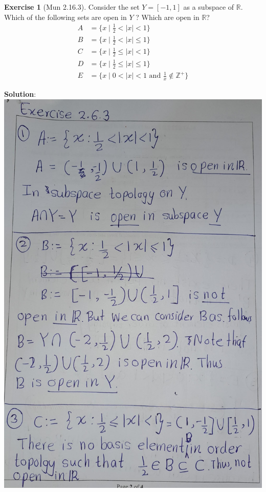 \documentclass[
]{book}
\theoremstyle{definition}
\theoremstyle{definition}
\theoremstyle{definition}
\newtheorem{exercise}{Exercise}[chapter]
\theoremstyle{definition}
\theoremstyle{remark}
\begin{document}
\begin{exercise}[Mun 2.16.3]
\protect\hypertarget{exr:unnamed-chunk-94}{}\label{exr:unnamed-chunk-94}Consider the set \(Y = [−1, 1]\) as a subspace of \(\mathbb{R}\). Which of the following sets are open in \(Y\) ? Which are open in \(\mathbb{R}\)?
\begin{align}
A &= \{ x \mid \frac{1}{2} < |x| < 1 \}\\ 
B &= \{ x \mid \frac{1}{2} < |x| \leq 1 \} \\
C &= \{ x \mid \frac{1}{2} \leq |x| < 1 \}\\
D &= \{ x \mid \frac{1}{2} \leq |x| \leq 1 \}\\
E &= \{ x \mid 0 < |x| < 1 \text{ and } \frac{1}{x} \notin \mathbb{Z}^+ \}
\end{align}
\end{exercise}

\textbf{Solution}:
\includegraphics{figures/Exercises/Ex 2.16/ex 3-1.jpg}
\end{document}

